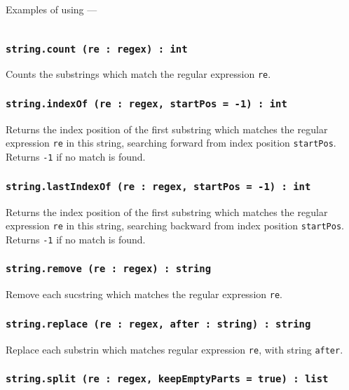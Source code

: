 Examples of using —
\inputminted[linenos]{icl}{../sources/regexplikearg.icL}

\subsubsection{\texttt{string.count (re : regex) : int}}

Counts the substrings which match the regular expression \texttt{re}.

\subsubsection{\texttt{string.indexOf (re : regex, startPos = -1) : int}}

Returns the index position of the first substring which matches the regular expression \texttt{re} in this string, searching forward from index position \texttt{startPos}. Returns \texttt{-1} if no match is found.

\subsubsection{\texttt{string.lastIndexOf (re : regex, startPos = -1) : int}}

Returns the index position of the first substring which matches the regular expression \texttt{re} in this string, searching backward from index position \texttt{startPos}. Returns \texttt{-1} if no match is found.

\subsubsection{\texttt{string.remove (re : regex) : string}}

Remove each sucstring which matches the regular expression \texttt{re}.

\subsubsection{\texttt{string.replace (re : regex, after : string) : string}}

Replace each substrin which matches regular expression \texttt{re}, with string \texttt{after}.

\subsubsection{\texttt{string.split (re : regex, keepEmptyParts = true) : list}}

